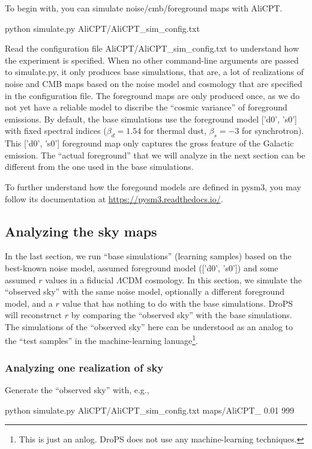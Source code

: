 \documentclass[12pt, a4paper]{ctexart} %
\def\tbox#1{\begin{tcolorbox}#1\end{tcolorbox}}
\begin{document}
To begin with, you can simulate noise/cmb/foreground maps with AliCPT.

\tbox{python simulate.py AliCPT/AliCPT\_sim\_config.txt}
Read the configuration file AliCPT/AliCPT\_sim\_config.txt to understand how the experiment is specified. When no other command-line arguments are passed to simulate.py, it only produces base simulations, that are, a lot of realizations of noise and CMB maps based on the noise model and cosmology that are specified in the configuration file. The foreground maps are only produced once, as we do not yet have a reliable model to discribe the ``cosmic variance'' of foreground emissions.
By default, the base simulations use the foreground model ['d0', 's0'] with fixed spectral indices ($\beta_d=1.54$ for thermal dust, $\beta_s=-3$ for synchrotron). This ['d0', 's0'] foreground map only captures the gross feature of the Galactic emission. The ``actual foreground'' that we will analyze in the next section can be different from the one used in the base simulations.

To further understand how the foregound models are defined in pysm3, you may follow its documentation at \url{https://pysm3.readthedocs.io/}.

\subsection{Analyzing the sky maps}

In the last section, we run ``base simulations'' (learning samples) based on the best-known noise model, assumed foreground model (['d0', 's0'])  and some assumed $r$ values in a fiducial $\Lambda$CDM cosmology. In this section, we simulate the ``observed sky'' with the same noise model, optionally a different foreground model, and a $r$ value that has nothing to do with the base simulations. DroPS will reconstruct $r$ by comparing the ``observed sky'' with  the base simulations. The simulations of the ``observed sky'' here can be understood as an analog to the ``test samples'' in the machine-learning lanuage\footnote{This is just an anlog. DroPS does not use any machine-learning techniques.}.

\subsubsection{Analyzing one realization of sky}

Generate the ``observed sky'' with, e.g.,
\tbox{python simulate.py AliCPT/AliCPT\_sim\_config.txt maps/AliCPT\_  0.01 999}
\end{document}
